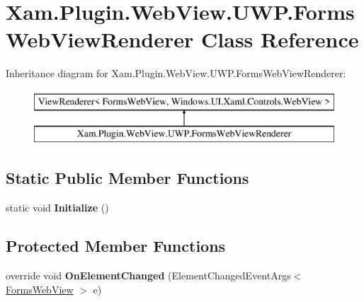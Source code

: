 \hypertarget{class_xam_1_1_plugin_1_1_web_view_1_1_u_w_p_1_1_forms_web_view_renderer}{}\section{Xam.\+Plugin.\+Web\+View.\+U\+W\+P.\+Forms\+Web\+View\+Renderer Class Reference}
\label{class_xam_1_1_plugin_1_1_web_view_1_1_u_w_p_1_1_forms_web_view_renderer}
Inheritance diagram for Xam.\+Plugin.\+Web\+View.\+U\+W\+P.\+Forms\+Web\+View\+Renderer\+:\begin{figure}[H]
\begin{center}
\leavevmode
\includegraphics[height=2.000000cm]{class_xam_1_1_plugin_1_1_web_view_1_1_u_w_p_1_1_forms_web_view_renderer}
\end{center}
\end{figure}
\subsection*{Static Public Member Functions}
\begin{DoxyCompactItemize}
\item 
\mbox{\label{class_xam_1_1_plugin_1_1_web_view_1_1_u_w_p_1_1_forms_web_view_renderer_ae06216c5811cae56bea42088b6cf2939}} 
static void {\bfseries Initialize} ()
\end{DoxyCompactItemize}
\subsection*{Protected Member Functions}
\begin{DoxyCompactItemize}
\item 
\mbox{\label{class_xam_1_1_plugin_1_1_web_view_1_1_u_w_p_1_1_forms_web_view_renderer_a06d1f60b6b69a9cffe6fa9dce16af7b1}} 
override void {\bfseries On\+Element\+Changed} (Element\+Changed\+Event\+Args$<$ \hyperlink{class_xam_1_1_plugin_1_1_web_view_1_1_abstractions_1_1_forms_web_view}{Forms\+Web\+View} $>$ e)
\end{DoxyCompactItemize}

